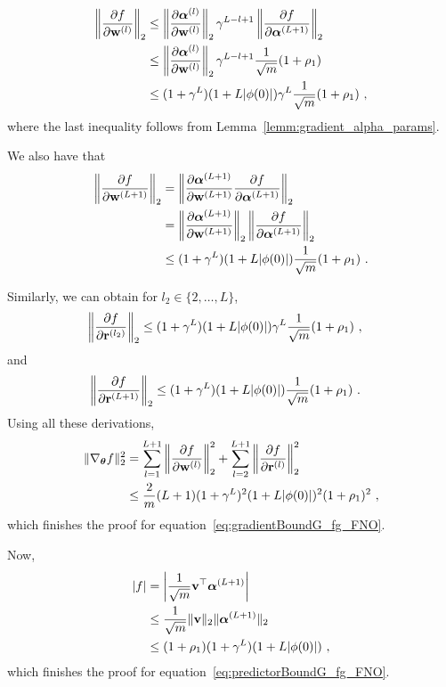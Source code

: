 \begin{align*}
\left\|\frac{\partial f}{\partial \mathbf{w}^{(l)}}\right\|_2 & \leq \left\| \frac{\partial \boldsymbol{\alpha}^{(l)}}{\partial \mathbf{w}^{(l)}}\right\|_2 \gamma^{L-l+1} \left\|\frac{\partial f}{\partial \boldsymbol{\alpha}^{(L+1)}}\right\|_2\\
&\leq 
\left\| \frac{\partial \boldsymbol{\alpha}^{(l)}}{\partial \mathbf{w}^{(l)}}\right\|_2 \gamma^{L-l+1} \frac{1}{\sqrt{m}}(1+\rho_1)\\
&\leq 
(1+\gamma^L)(1+L|\phi(0)|)\gamma^{L} \frac{1}{\sqrt{m}}(1+\rho_1)~,
\end{align*}
where the last inequality follows from Lemma~\ref{lemm:gradient_alpha_params}.

We also have that
\begin{align*}
\left\|\frac{\partial f}{\partial \mathbf{w}^{(L+1)}}\right\|_2 & =
\left\|\frac{\partial \boldsymbol{\alpha}^{(L+1)}}{\partial \mathbf{w}^{(L+1)}} \frac{\partial f}{\partial \boldsymbol{\alpha}^{(L+1)}}\right\|_2\\
& =
\left\|\frac{\partial \boldsymbol{\alpha}^{(L+1)}}{\partial \mathbf{w}^{(L+1)}}\right\|_2\left\| \frac{\partial f}{\partial \boldsymbol{\alpha}^{(L+1)}}\right\|_2\\
&\leq (1+\gamma^L)(1+L|\phi(0)|)\frac{1}{\sqrt{m}}(1+\rho_1)~.
\end{align*}

Similarly, we can obtain for $l_2\in\{2,\dots,L\}$,
\begin{align*}
\left\|\frac{\partial f}{\partial \mathbf{r}^{(l_2)}}\right\|_2 &\leq 
(1+\gamma^L)(1+L|\phi(0)|)\gamma^{L} \frac{1}{\sqrt{m}}(1+\rho_1)~,
\end{align*}
and
\begin{align*}
\left\|\frac{\partial f}{\partial \mathbf{r}^{(L+1)}}\right\|_2 
&\leq (1+\gamma^L)(1+L|\phi(0)|)\frac{1}{\sqrt{m}}(1+\rho_1)~.
\end{align*}
Using all these derivations, 
\begin{align*}
\lVert\nabla_{{\bm{\theta}}}f\rVert_2^2 &=\sum^{L+1}_{l=1}\left\|\frac{\partial f}{\partial \mathbf{w}^{(l)}}\right\|_2^2 + \sum^{L+1}_{l=2}\left\|\frac{\partial f}{\partial \mathbf{r}^{(l)}}\right\|_2^2\\
&\leq \frac{2}{m}(L+1)(1+\gamma^L)^2(1+L|\phi(0)|)^2(1+\rho_1)^2~,
\end{align*}
which finishes the proof for equation~\eqref{eq:gradientBoundG_fg_FNO}.

Now, 
\begin{align*}
|f| &=\left|\frac{1}{\sqrt{m}}\mathbf{v}^\top\boldsymbol{\alpha}^{(L+1)}\right|\\
&\leq \frac{1}{\sqrt{m}}\lVert\mathbf{v}\rVert_2\lVert\boldsymbol{\alpha}^{(L+1)}\rVert_2\\
&\leq (1+\rho_1)(1+\gamma^L)(1+L|\phi(0)|)~,
\end{align*}
which finishes the proof for equation~\eqref{eq:predictorBoundG_fg_FNO}. 

